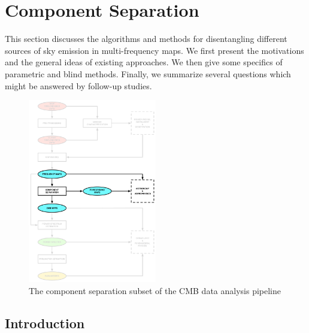           
\section{Component Separation}
\label{sec:compsep}

%

This section discusses the algorithms and methods for disentangling different sources of sky emission in multi-frequency maps. 
We first present the motivations and the general ideas of existing approaches. 
We then give some specifics of parametric and blind methods. 
Finally, we summarize several questions which might be answered by follow-up studies.

\begin{figure}[htbp]
\centering
\includegraphics[width=0.5\textwidth]{Analysis/cs}
\caption{The component separation subset of the CMB data analysis pipeline}
\label{fig:general_comp_sep_scheme}
\end{figure}

\subsection{Introduction}

